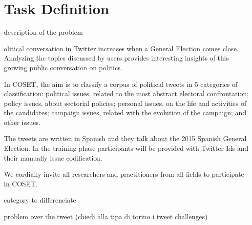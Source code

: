 \section{Task Definition} \label{sec:problem}

description of the problem

olitical conversation in Twitter increases when a General Election comes close. Analyzing the topics discussed by users provides interesting insights of this growing public conversation on politics.

In COSET, the aim is to classify a corpus of political tweets in 5 categories of classification: political issues, related to the most abstract electoral confrontation; policy issues, about sectorial policies; personal issues, on the life and activities of the candidates; campaign issues, related with the evolution of the campaign; and other issues.

The tweets are written in Spanish and they talk about the 2015 Spanish General Election. In the training phase participants will be provided with Twitter Ids and their manually issue codification.

We cordially invite all researchers and practitioners from all fields to participate in COSET.

category to differenciate

problem over the tweet (chiedi alla tipa di torino i tweet challenges)